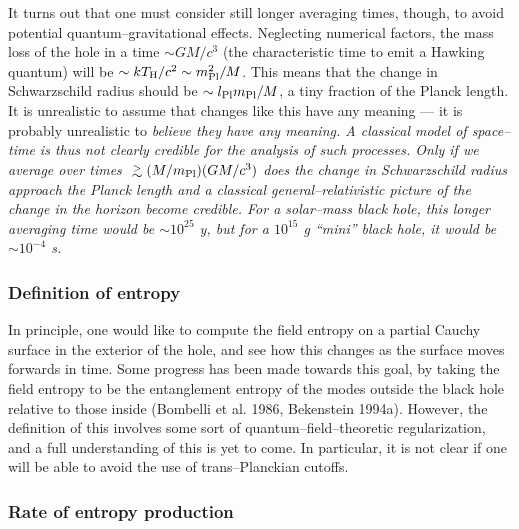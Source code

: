 It turns out that one must consider still longer averaging times, though, to
avoid potential quantum--gravitational effects. Neglecting numerical factors,
the mass loss of the hole in a time $\sim GM/c^3$ (the characteristic time to
emit a Hawking quantum) will be $\sim kT_{\rm H}/c^2\sim m_{\rm Pl}^2/M$.  This
means that the change in Schwarzschild radius should be $\sim l_{\rm Pl}m_{\rm
Pl}/M$, a tiny  fraction of the Planck length.  It is unrealistic to assume
that changes like this have any meaning --- it is probably unrealistic to \it
believe \rm they have any meaning.  A classical model of space--time is thus
not clearly credible for the analysis of such processes.  Only if we average
over times $\gtrsim (M/m_{\rm Pl})(GM/c^3)$ does the change in Schwarzschild
radius approach the Planck length and a classical general--relativistic picture
of the change in the horizon become credible.  For a solar--mass black hole,
this longer averaging time would be $\sim 10^{25}$ y, but for a $10^{15}$ g
``mini'' black hole, it would be $\sim 10^{-4}$ s. 

\subsubsection{Definition of entropy}

In principle, one would like to compute the field entropy on a partial Cauchy
surface in the exterior of the hole, and see how this  changes as the surface
moves forwards in time.  Some progress has been made towards this goal, by
taking the field entropy to be the entanglement entropy of the modes outside
the black hole relative to those inside (Bombelli et al. 1986, Bekenstein
1994a).  However, the definition of this involves some sort of
quantum--field--theoretic regularization, and a full understanding of this is
yet to come.  In particular, it is not clear if one will be able to avoid the
use of trans--Planckian cutoffs.

\subsubsection{Rate of entropy production}

